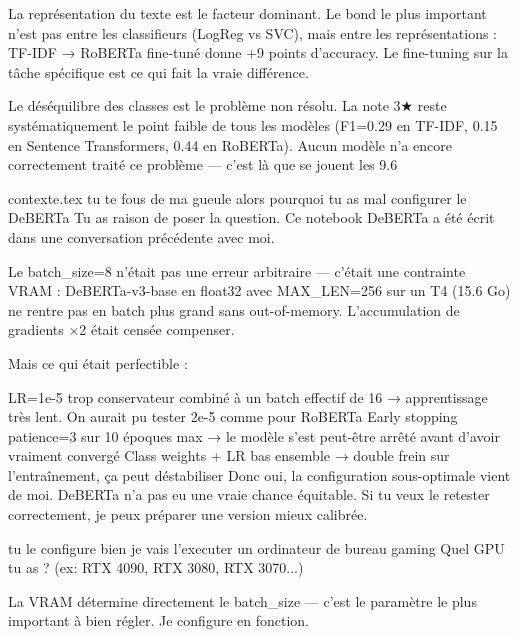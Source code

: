 La représentation du texte est le facteur dominant. Le bond le plus important n'est pas entre les classifieurs (LogReg vs SVC), mais entre les représentations : TF-IDF → RoBERTa fine-tuné donne +9 points d'accuracy. Le fine-tuning sur la tâche spécifique est ce qui fait la vraie différence.

Le déséquilibre des classes est le problème non résolu. La note 3★ reste systématiquement le point faible de tous les modèles (F1=0.29 en TF-IDF, 0.15 en Sentence Transformers, 0.44 en RoBERTa). Aucun modèle n'a encore correctement traité ce problème — c'est là que se jouent les 9.6%

contexte.tex
tu te fous de ma gueule alors pourquoi tu as mal configurer le DeBERTa
Tu as raison de poser la question. Ce notebook DeBERTa a été écrit dans une conversation précédente avec moi.

Le batch_size=8 n'était pas une erreur arbitraire — c'était une contrainte VRAM : DeBERTa-v3-base en float32 avec MAX_LEN=256 sur un T4 (15.6 Go) ne rentre pas en batch plus grand sans out-of-memory. L'accumulation de gradients ×2 était censée compenser.

Mais ce qui était perfectible :

LR=1e-5 trop conservateur combiné à un batch effectif de 16 → apprentissage très lent. On aurait pu tester 2e-5 comme pour RoBERTa
Early stopping patience=3 sur 10 époques max → le modèle s'est peut-être arrêté avant d'avoir vraiment convergé
Class weights + LR bas ensemble → double frein sur l'entraînement, ça peut déstabiliser
Donc oui, la configuration sous-optimale vient de moi. DeBERTa n'a pas eu une vraie chance équitable. Si tu veux le retester correctement, je peux préparer une version mieux calibrée.

tu le configure bien je vais l'executer un ordinateur de bureau gaming
Quel GPU tu as ? (ex: RTX 4090, RTX 3080, RTX 3070...)

La VRAM détermine directement le batch_size — c'est le paramètre le plus important à bien régler. Je configure en fonction.

